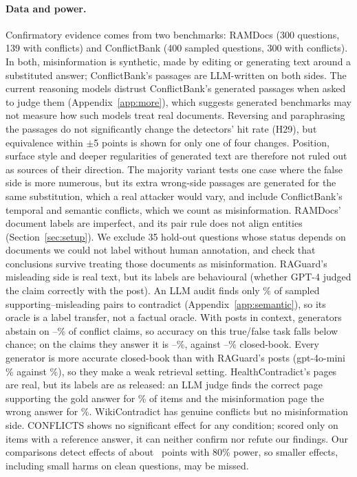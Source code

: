 \paragraph{Data and power.} Confirmatory evidence comes from two benchmarks: RAMDocs (300 questions, 139
with conflicts) and ConflictBank (400 sampled questions, 300 with conflicts). In both, misinformation is
synthetic, made by editing or generating text around a substituted answer; ConflictBank's passages are LLM-written
on both sides. The current reasoning models distrust ConflictBank's generated passages when asked to judge them
(Appendix~\ref{app:more}), which suggests generated benchmarks may not measure how such models treat real
documents. Reversing and paraphrasing the passages do not significantly change the detectors' hit rate (H29), but
equivalence within $\pm$5 points is shown for only one of four changes. Position, surface style and deeper regularities of generated text are therefore
not ruled out as sources of their direction. The majority variant tests one
case where the false side is more numerous, but its extra wrong-side passages are generated for the same substitution,
which a real attacker would vary, and include ConflictBank's temporal and semantic conflicts, which we count as
misinformation. RAMDocs' document labels are imperfect, and its pair rule does not align entities
(Section~\ref{sec:setup}). We exclude 35 hold-out questions whose status depends on
documents we could not label without human annotation, and check that conclusions survive treating those
documents as misinformation. RAGuard's misleading side is real text, but its labels are behavioural (whether GPT-4
judged the claim correctly with the post). An LLM audit finds only \rgAudContradict\% of sampled supporting--misleading
pairs to contradict (Appendix~\ref{app:semantic}), so its oracle is a label transfer, not a factual oracle. With
posts in context, generators abstain on \rgAbstMin--\rgAbstMax\% of conflict claims, so accuracy on this
true/false task falls below chance; on the claims they answer it is \rgAnsMin--\rgAnsMax\%, against
\rgCbMin--\rgCbMax\% closed-book. Every generator is more accurate closed-book than with RAGuard's posts
(gpt-4o-mini \zcRgMiniConflict\% against \zpRgMiniConflict\%), so they make a weak retrieval setting.
HealthContradict's pages are real, but its labels are as released: an LLM judge finds the correct page supporting
the gold answer for \hcLabCorrect\% of items and the misinformation page the wrong answer for \hcLabMis\%.
WikiContradict has genuine conflicts but no misinformation side. CONFLICTS shows no significant effect for any
condition; scored only on items with a reference answer, it can neither confirm nor refute our findings. Our
comparisons detect effects of about \mdeMed\ points with 80\% power, so smaller effects, including small harms on clean
questions, may be missed.

